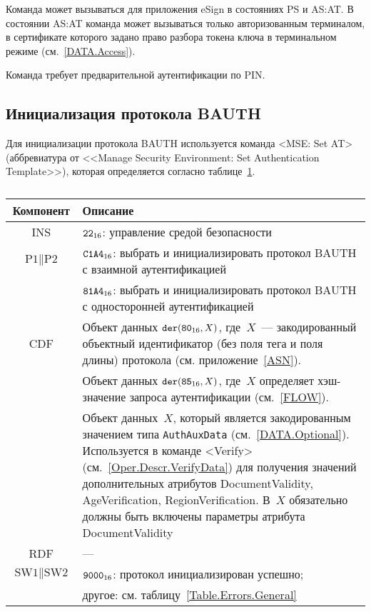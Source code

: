 Команда может вызываться для приложения eSign в 
состояниях PS и AS:AT. В состоянии AS:AT команда 
может вызываться только авторизованным терминалом,
в сертификате которого задано право 
разбора токена ключа в терминальном режиме (см.~\ref{DATA.Access}).

Команда требует предварительной аутентификации по PIN. 


\subsection{Инициализация протокола BAUTH}
\label{Oper.Descr.SetBAUTH}

Для инициализации протокола BAUTH используется
команда <MSE: Set AT> 
(аббревиатура от <<Manage Security Environment: Set 
Authentication Template>>), 
которая определяется согласно 
таблице~\ref{Table.Oper.SetBAUTHCmd}.

\begin{table}[hbt]
\caption{}\label{Table.Oper.SetBAUTHCmd}
\begin{tabular}{|c|p{14cm}|}
\hline
Компонент & Описание \\
\hline
\hline
INS & $\texttt{22}_{16}$: управление средой безопасности\\ 
\hline
$\text{P1} \parallel\text{P2}$ & $\texttt{C1A4}_{16}$: выбрать и 
инициализировать протокол BAUTH с взаимной 
аутентификацией\\ 
 & $\texttt{81A4}_{16}$: выбрать и инициализировать протокол BAUTH с 
односторонней аутентификацией\\
\hline
CDF & Объект данных 
$\texttt{der}(\texttt{80}_{16}, X)$, где~$X$~--- 
закодированный объектный идентификатор (без поля тега и поля 
длины) протокола (см. приложение~\ref{ASN}).\\
 & Объект данных $\texttt{der}(\texttt{85}_{16}, X)$, 
где~$X$ определяет хэш-значение запроса аутентификации (см.~\ref{FLOW}).\\
 & Объект данных~$X$, который является 
закодированным значением типа \verb|AuthAuxData| (см.~\ref{DATA.Optional}). 
Используется в команде <Verify> (см.~\ref{Oper.Descr.VerifyData}) 
для получения значений дополнительных атрибутов DocumentValidity, 
AgeVerification, RegionVerification. В~$X$ 
обязательно должны быть включены параметры атрибута DocumentValidity\\
\hline 
RDF &  --- \\
\hline
$\text{SW1} \parallel \text{SW2}$ & 
$\texttt{9000}_{16}$: протокол инициализирован успешно; \\
  & другое: см. таблицу~\ref{Table.Errors.General}\\
\hline
\end{tabular}
\end{table}

